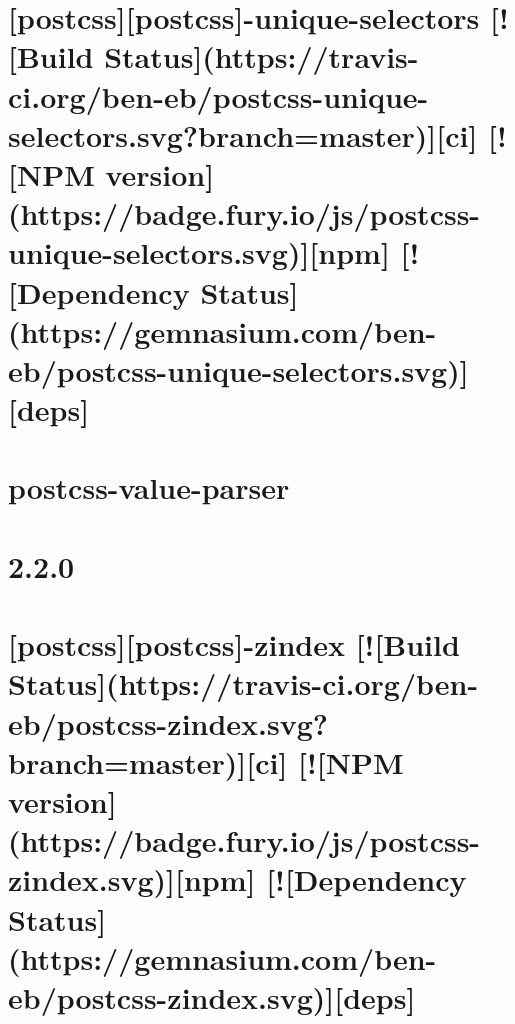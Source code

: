 \documentclass[twoside]{book}
\newcommand{\+}{\discretionary{\mbox{\scriptsize$\hookleftarrow$}}{}{}}
\begin{document}
\chapter{\mbox{[}postcss\mbox{]}\mbox{[}postcss\mbox{]}-\/unique-\/selectors \mbox{[}!\mbox{[}Build Status\mbox{]}(https\+://travis-\/ci.org/ben-\/eb/postcss-\/unique-\/selectors.svg?branch=master)\mbox{]}\mbox{[}ci\mbox{]} \mbox{[}!\mbox{[}N\+PM version\mbox{]}(https\+://badge.fury.\+io/js/postcss-\/unique-\/selectors.svg)\mbox{]}\mbox{[}npm\mbox{]} \mbox{[}!\mbox{[}Dependency Status\mbox{]}(https\+://gemnasium.com/ben-\/eb/postcss-\/unique-\/selectors.svg)\mbox{]}\mbox{[}deps\mbox{]}}
\label{md__c_1_workspace_demo_src_main_script_node_modules_postcss-unique-selectors__r_e_a_d_m_e}

\chapter{postcss-\/value-\/parser}
\label{md__c_1_workspace_demo_src_main_script_node_modules_postcss-value-parser__r_e_a_d_m_e}

\chapter{2.2.0}
\label{md__c_1_workspace_demo_src_main_script_node_modules_postcss-zindex__c_h_a_n_g_e_l_o_g}

\chapter{\mbox{[}postcss\mbox{]}\mbox{[}postcss\mbox{]}-\/zindex \mbox{[}!\mbox{[}Build Status\mbox{]}(https\+://travis-\/ci.org/ben-\/eb/postcss-\/zindex.svg?branch=master)\mbox{]}\mbox{[}ci\mbox{]} \mbox{[}!\mbox{[}N\+PM version\mbox{]}(https\+://badge.fury.\+io/js/postcss-\/zindex.svg)\mbox{]}\mbox{[}npm\mbox{]} \mbox{[}!\mbox{[}Dependency Status\mbox{]}(https\+://gemnasium.com/ben-\/eb/postcss-\/zindex.svg)\mbox{]}\mbox{[}deps\mbox{]}}
\label{md__c_1_workspace_demo_src_main_script_node_modules_postcss-zindex__r_e_a_d_m_e}

\end{document}

